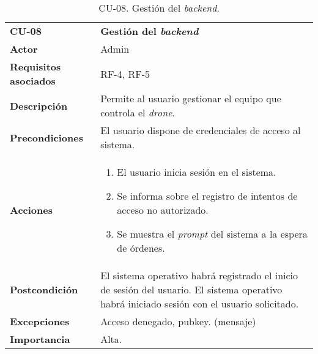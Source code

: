 \begin{table}[H]
	\begin{center}
		\begin{tabular}{m{3cm}  m{10cm}}\hline
			\toprule
			\textbf{CU-08} & \textbf{Gestión del \emph{backend}}\\
			\otoprule
			\textbf{Actor} & Admin\\
			\textbf{Requisitos asociados} & RF-4, RF-5\\
			\textbf{Descripción} & Permite al usuario gestionar el equipo que controla el \emph{drone}.\\
			\textbf{Precondiciones} & El usuario dispone de credenciales de acceso al sistema.\\
			\textbf{Acciones} & \begin{enumerate}
											\item El usuario inicia sesión en el sistema.
											\item Se informa sobre el registro de intentos de acceso no autorizado.
											\item Se muestra el \emph{prompt} del sistema a la espera de órdenes.
											\end{enumerate}\\
			
			\textbf{Postcondición} & El sistema operativo habrá registrado el inicio de sesión del usuario. El sistema operativo habrá iniciado sesión con el usuario solicitado.\\
			\textbf{Excepciones} & Acceso denegado, pubkey. (mensaje)\\
			\textbf{Importancia} & Alta.\\
			\hline
			\bottomrule
		\end{tabular}
		\caption{CU-08. Gestión del \emph{backend}.}
		\label{tb:CU08}
	\end{center}
\end{table}


